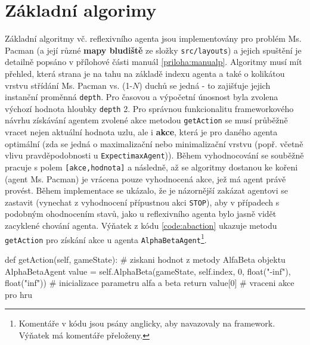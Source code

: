 \section{Základní algorimy}
Základní algoritmy vč. reflexivního agenta jsou implementovány pro problém Ms. Pacman (a její různé \textbf{mapy bludiště} ze složky \texttt{src/layouts}) a jejich spuštění je detailně popsáno v přílohové části manuál \ref{priloha:manualp}. Algoritmy musí mít přehled, která strana je na tahu na základě indexu agenta a také o kolikátou vrstvu střídání Ms. Pacman vs. (1-$N$) duchů se jedná - to zajišťuje jejich instanční proměnná \texttt{depth}. Pro časovou a výpočetní únosnost byla zvolena výchozí hodnota hloubky \texttt{depth} 2. Pro správnou funkcionalitu frameworkového návrhu získávání agentem zvolené akce metodou \texttt{getAction} se musí průběžně vracet nejen aktuální hodnota uzlu, ale i \textbf{akce}, která je pro daného agenta optimální (zda se jedná o maximalizační nebo minimalizační vrstvu (popř. včetně vlivu pravděpodobnosti u \texttt{ExpectimaxAgent})). Během vyhodnocování se souběžně pracuje s polem \texttt{[akce,hodnota]} a následně, až se algoritmy dostanou ke kořeni (agent Ms. Pacman) je vrácena pouze vyhodnocená akce, jež má agent právě provést. Během implementace se ukázalo, že je názornější zakázat agentovi se zastavit (vynechat z vyhodnocení přípustnou akci \texttt{STOP}), aby v případech s podobným ohodnocením stavů, jako u reflexivního agenta bylo jasně vidět zacyklené chování agenta.
Výňatek z kódu \ref{code:abaction} ukazuje metodu \texttt{getAction} pro získání akce u agenta \texttt{AlphaBetaAgent}\footnote{Komentáře v kódu jsou psány anglicky, aby navazovaly na framework. Výňatek má komentáře přeloženy.}.

\begin{python}[label={code:abaction}]
def getAction(self, gameState):
   # ziskani hodnot z metody AlfaBeta objektu AlphaBetaAgent
   value = self.AlphaBeta(gameState, self.index, 0,
   float("-inf"), float("inf")) # inicializace parametru alfa a beta
   return value[0] # vraceni akce pro hru
\end{python}

